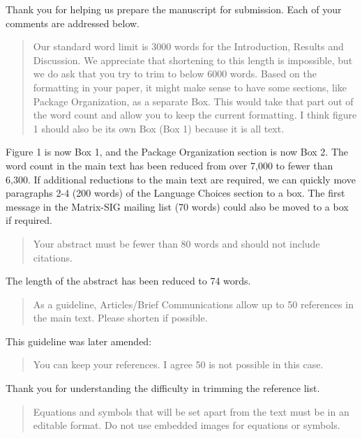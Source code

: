 \documentclass[10pt,stdletter,dateno]{newlfm}
\begin{document}
\begin{newlfm}

Thank you for helping us prepare the manuscript for submission. Each of your comments are addressed below.

\begin{quote}
Our standard word limit is 3000 words for the Introduction, Results and Discussion. We appreciate that shortening to this length is impossible, but we do ask that you try to trim to below 6000 words. Based on the formatting in your paper, it might make sense to have some sections, like Package Organization, as a separate Box. This would take that part out of the word count and allow you to keep the current formatting. I think figure 1 should also be its own Box (Box 1) because it is all text.
\end{quote}

Figure 1 is now Box 1, and the Package Organization section is now Box 2. The word count in the main text has been reduced from over 7,000 to fewer than 6,300. If additional reductions to the main text are required, we can quickly move paragraphs 2-4 (200 words) of the Language Choices section to a box. The first message in the Matrix-SIG mailing list (70 words) could also be moved to a box if required.

\begin{quote}
Your abstract must be fewer than 80 words and should not include citations.
\end{quote}

The length of the abstract has been reduced to 74 words. 

\begin{quote}
As a guideline, Articles/Brief Communications allow up to 50 references in the main text. Please shorten if possible.
\end{quote}

This guideline was later amended:

\begin{quote}
You can keep your references. I agree 50 is not possible in this case.
\end{quote}

Thank you for understanding the difficulty in trimming the reference list. 

\begin{quote}
Equations and symbols that will be set apart from the text must be in an editable format. Do not use embedded images for equations or symbols.
\end{quote}


\end{newlfm}
\end{document}
